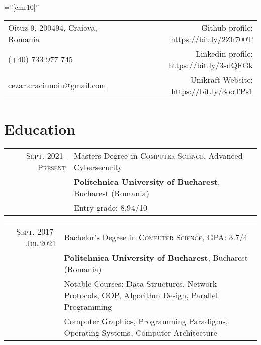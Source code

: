 \documentclass[a4paper,10pt]{article}
\begin{document}
\pagestyle{empty}    %
\font\fb=''[cmr10]'' %


\begin{tabular}{lr}
    \footnotesize{Oituz 9, 200494, Craiova, Romania \hspace{225pt}} & \footnotesize{Github profile: \url{https://bit.ly/2Zh700T}} \\
    \footnotesize{(+40) 733 977 745} & \footnotesize{Linkedin profile: \url{https://bit.ly/3sdQFGk}} \\
    \footnotesize{\href{mailto:cezar.craciunoiu@gmail.com}{cezar.craciunoiu@gmail.com}} & \footnotesize{Unikraft Website: \url{https://bit.ly/3ooTPs1}} \\
\end{tabular}		

\par{\bigskip\par}

\section{Education}
\begin{tabular}{rl}	
	\textsc{Sept.} 2021-\textsc{Present}& Masters Degree in \textsc{Computer Science}, Advanced Cybersecurity \\&
	\normalsize\textbf{Politehnica University of Bucharest}, Bucharest (Romania) \\&
	\footnotesize{Entry grade: 8.94/10}
\end{tabular}

\begin{tabular}{rl}	
	\textsc{Sept.} 2017-\textsc{Jul.}2021& Bachelor's Degree in \textsc{Computer Science}, GPA: 3.7/4 \\&
	\normalsize\textbf{Politehnica University of Bucharest}, Bucharest (Romania)\\&
	\footnotesize{Notable Courses: Data Structures, Network Protocols, OOP, Algorithm Design, Parallel Programming} \\&
	\footnotesize{Computer Graphics, Programming Paradigms, Operating Systems, Computer Architecture}
\end{tabular}

\end{document}
